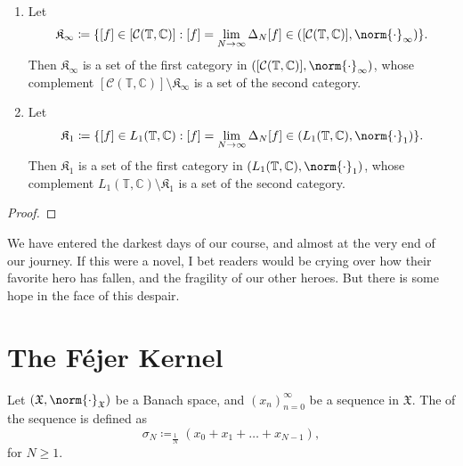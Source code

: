 \documentclass[notoc,notitlepage]{tufte-book}
\begin{document}
\begin{thm}\label{thm:the_textit_unbearable_lousiness_of_being_a_dirichlet_kernel}
  \begin{enumerate}
    \item Let 
      \begin{equation*}
        \mathfrak{K}_{\infty} \coloneqq \{ [f] \in [\mathcal{C}(\mathbb{T}, \mathbb{C})]
          : [f] = \lim_{N \to \infty} \Delta_N[f]
          \in ([\mathcal{C}(\mathbb{T}, \mathbb{C})], \norm{\cdot}_{\infty}) \}.
      \end{equation*}
      Then $\mathfrak{K}_{\infty}$ is a set of the first category in
      $([\mathcal{C}(\mathbb{T},\mathbb{C})], \norm{\cdot}_{\infty})$, whose complement
      $[\mathcal{C}(\mathbb{T},\mathbb{C})] \setminus \mathfrak{K}_{\infty}$
      is a set of the second category.

    \item Let
      \begin{equation*}
        \mathfrak{K}_1 \coloneqq \{ [f] \in L_1(\mathbb{T}, \mathbb{C})
          : [f] = \lim_{N \to \infty} \Delta_N[f]
          \in (L_1(\mathbb{T}, \mathbb{C}), \norm{\cdot}_1) \}.
      \end{equation*}
      Then $\mathfrak{K}_1$ is a set of the first category in
      $(L_1(\mathbb{T},\mathbb{C}), \norm{\cdot}_1)$, whose complement
      $L_1(\mathbb{T}, \mathbb{C}) \setminus \mathfrak{K}_1$
      is a set of the second category.
  \end{enumerate}
\end{thm}

\begin{proof}
\end{proof}

We have entered the darkest days of our course,
and almost at the very end of our journey.
If this were a novel, I bet readers would be crying over 
how their favorite hero has fallen,
and the fragility of our other heroes.
But there is some hope in the face of this despair.


\section{The Féjer Kernel}%
\label{sec:the_fejer_kernel}

\begin{defn}\label{defn:_n_textsuperscript_th_cesaro_mean}
  Let $(\mathfrak{X}, \norm{\cdot}_{\mathfrak{X}})$ be a Banach space,
  and $(x_n)_{n=0}^{\infty}$ be a sequence in $\mathfrak{X}$.
  The  of the sequence
  is defined as
  \begin{equation*}
    \sigma_N \coloneqq_\frac{1}{N} \left( x_0 + x_1 + \hdots + x_{N-1} \right),
  \end{equation*}
  for $N \geq 1$.
\end{defn}
\end{document}
